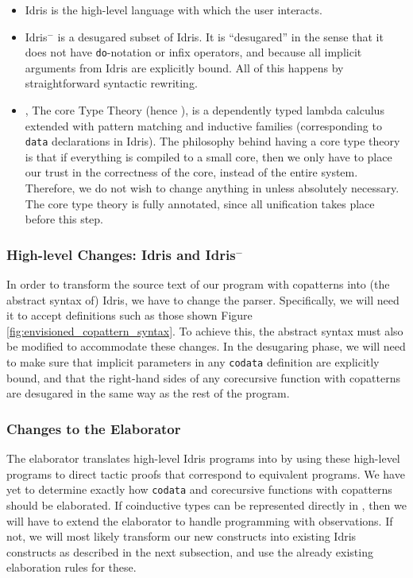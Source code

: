 \begin{itemize}
\item Idris is the high-level language with which the user interacts.
\item Idris$^-$ %
is a desugared subset of Idris. It is ``desugared'' in the sense that it does not have \texttt{do}-notation or infix operators, and because all implicit arguments from Idris are explicitly bound. All of this happens by straightforward syntactic rewriting.
\item \TT, The core Type Theory (hence \TT), is a dependently typed lambda calculus extended with pattern matching and inductive families (corresponding to \texttt{data} declarations in Idris). The philosophy behind having a core type theory is that if everything is compiled to a small core, then we only have to place our trust in the correctness of the core, instead of the entire system. Therefore, we do not wish to change anything in \TT{} unless absolutely necessary. The core type theory is fully annotated, since all unification takes place before this step.
\end{itemize}

\subsubsection{High-level Changes: Idris and Idris$^-$}
In order to transform the source text of our program with copatterns into (the abstract syntax of) Idris, we have to change the parser. Specifically, we will need it to accept definitions such as those shown Figure \ref{fig:envisioned_copattern_syntax}. To achieve this, the abstract syntax must also be modified to accommodate these changes. In the desugaring phase, we will need to make sure that implicit parameters in any \texttt{codata} definition are explicitly bound, and that the right-hand sides of any corecursive function with copatterns are desugared in the same way as the rest of the program.

\subsubsection{Changes to the Elaborator}
The elaborator translates high-level Idris programs into \TT{} by using these high-level programs to direct tactic proofs that correspond to equivalent \TT{} programs. We have yet to determine exactly how \texttt{codata} and corecursive functions with copatterns should be elaborated. If coinductive types can be represented directly in \TT, then we will have to extend the elaborator to handle programming with observations. If not, we will most likely transform our new constructs into existing Idris constructs as described in the next subsection, and use the already existing elaboration rules for these.


